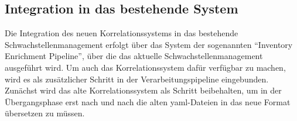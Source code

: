 \subsection{Integration in das bestehende System}\label{subsec:impl-integration}

Die Integration des neuen Korrelationssystems in das bestehende Schwachstellenmanagement erfolgt über das System der sogenannten \enquote{Inventory Enrichment Pipeline}, über die das aktuelle Schwachstellenmanagement ausgeführt wird.
Um auch das Korrelationssystem dafür verfügbar zu machen, wird es als zusätzlicher Schritt in der Verarbeitungspipeline eingebunden.
Zunächst wird das alte Korrelationssystem als Schritt beibehalten, um in der Übergangsphase erst nach und nach die alten \acrshort{yaml}-Dateien in das neue Format übersetzen zu müssen.
